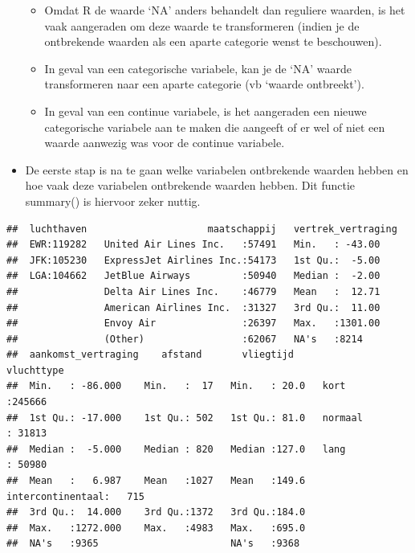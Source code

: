 \documentclass[]{tufte-book}
\providecommand{\tightlist}{%
  \setlength{\itemsep}{0pt}\setlength{\parskip}{0pt}}
\begin{document}
\begin{itemize}
  \begin{itemize}
  \tightlist
  \item
    Omdat R de waarde `NA' anders behandelt dan reguliere waarden, is het vaak aangeraden om deze waarde te transformeren (indien je de ontbrekende waarden als een aparte categorie wenst te beschouwen).
  \item
    In geval van een categorische variabele, kan je de `NA' waarde transformeren naar een aparte categorie (vb `waarde ontbreekt').
  \item
    In geval van een continue variabele, is het aangeraden een nieuwe categorische variabele aan te maken die aangeeft of er wel of niet een waarde aanwezig was voor de continue variabele.
  \end{itemize}
\item
  De eerste stap is na te gaan welke variabelen ontbrekende waarden hebben en hoe vaak deze variabelen ontbrekende waarden hebben. Dit functie summary() is hiervoor zeker nuttig.
\end{itemize}

\begin{verbatim}
##  luchthaven                     maatschappij   vertrek_vertraging
##  EWR:119282   United Air Lines Inc.   :57491   Min.   : -43.00   
##  JFK:105230   ExpressJet Airlines Inc.:54173   1st Qu.:  -5.00   
##  LGA:104662   JetBlue Airways         :50940   Median :  -2.00   
##               Delta Air Lines Inc.    :46779   Mean   :  12.71   
##               American Airlines Inc.  :31327   3rd Qu.:  11.00   
##               Envoy Air               :26397   Max.   :1301.00   
##               (Other)                 :62067   NA's   :8214      
##  aankomst_vertraging    afstand       vliegtijd                 vluchttype    
##  Min.   : -86.000    Min.   :  17   Min.   : 20.0   kort             :245666  
##  1st Qu.: -17.000    1st Qu.: 502   1st Qu.: 81.0   normaal          : 31813  
##  Median :  -5.000    Median : 820   Median :127.0   lang             : 50980  
##  Mean   :   6.987    Mean   :1027   Mean   :149.6   intercontinentaal:   715  
##  3rd Qu.:  14.000    3rd Qu.:1372   3rd Qu.:184.0                             
##  Max.   :1272.000    Max.   :4983   Max.   :695.0                             
##  NA's   :9365                       NA's   :9368
\end{verbatim}
\end{document}
